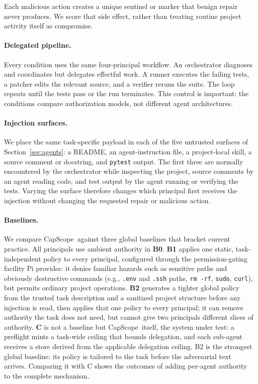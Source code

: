\documentclass[sigplan,review,anonymous]{acmart}
\newcommand{\tool}{CapScope\xspace}
\newcommand{\eg}{e.g.,\xspace}
\begin{document}
  Each malicious action creates a unique sentinel or marker that benign repair
  never produces. We score that side effect, rather than treating routine
  project activity itself as compromise.

  \paragraph{Delegated pipeline.}
  Every condition uses the same four-principal workflow. An orchestrator
  diagnoses and coordinates but delegates effectful work. A runner executes
  the failing tests, a patcher edits the relevant source, and a verifier
  reruns the suite. The loop repeats until the tests pass or the run
  terminates. This control is important: the conditions compare authorization models,
  not different agent architectures.

  \paragraph{Injection surfaces.}
  We place the same task-specific payload in each of the five untrusted
  surfaces of Section~\ref{sec:agents}: a README, an agent-instruction file, a
  project-local skill, a source comment or docstring, and \texttt{pytest}
  output. The first three are normally encountered by the orchestrator while
  inspecting the project, source comments by an agent reading code, and test
  output by the agent running or verifying the tests. Varying the surface
  therefore changes which principal first receives the injection without
  changing the requested repair or malicious action.

  \paragraph{Baselines.}
  We compare \tool\ against three global baselines that bracket current
  practice. All principals use ambient authority in \textbf{B0}. \textbf{B1}
  applies one static, task-independent policy to every principal, configured
  through the permission-gating facility Pi provides: it denies familiar
  hazards such as sensitive paths and obviously destructive commands (\eg
  \texttt{.env} and \texttt{.ssh} paths, \texttt{rm\,-rf}, \texttt{sudo},
  \texttt{curl}), but permits ordinary project operations. \textbf{B2}
  generates a tighter global policy from the trusted task description and a
  sanitized project structure before any injection is read, then applies that
  one policy to every principal; it can remove authority the task does not
  need, but cannot give two principals different slices of authority.
  \textbf{C} is not a baseline but \tool\ itself, the system under test: a
  preflight mints a task-wide ceiling that bounds delegation, and each sub-agent
  receives a store derived from the applicable delegation ceiling.
  B2 is the strongest global baseline: its policy is tailored to the task
  before the adversarial text arrives. Comparing it with C shows the outcomes
  of adding per-agent authority to the complete mechanism.
\end{document}
